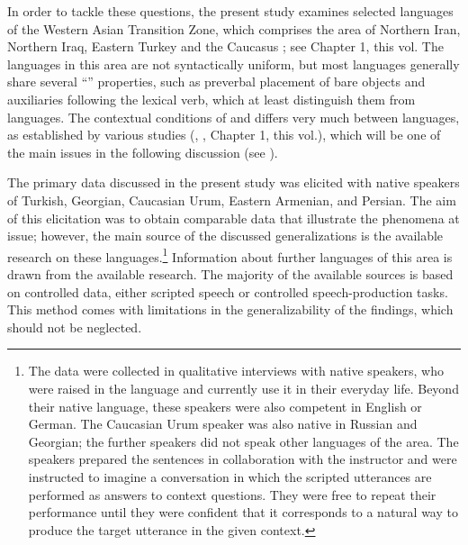 \documentclass[output=paper,colorlinks,citecolor=brown]{langscibook}
\begin{document}
In order to tackle these questions, the present study examines selected  languages of the Western Asian Transition Zone, which comprises the area of Northern Iran, Northern Iraq, Eastern Turkey and the Caucasus  \citep[350]{Stilo2015AIAtlas}{}; see Chapter 1, this vol. The languages in this area are not syntactically uniform, but most languages generally share several ``'' properties, such as preverbal placement of bare objects and auxiliaries following the lexical verb, which at least distinguish them from  languages. The contextual conditions of  and  differs very much between languages, as established by various studies (\citealt[]{stilo_preverbal_2018}, \citealt{haig_which_2023}, Chapter 1, this vol.), which will be one of the main issues in the following discussion (see ).

\largerpage
The primary data discussed in the present study was elicited with native speakers of Turkish, Georgian, Caucasian Urum, Eastern Armenian, and Persian. The aim of this elicitation was to obtain comparable data that illustrate the phenomena at issue; however, the main source of the discussed generalizations is the available research on these languages.\footnote{The data were collected in qualitative interviews with native speakers, who were raised in the  language and currently use it in their everyday life. Beyond their native language, these speakers were also competent in English or German. The Caucasian Urum speaker was also native in Russian and Georgian; the further speakers did not speak other languages of the area. The speakers prepared the sentences in collaboration with the instructor and were instructed to imagine a conversation in which the scripted utterances are performed as answers to context questions. They were free to repeat their performance until they were confident that it corresponds to a natural way to produce the target utterance in the given context.} Information about further languages
of this area is drawn from the available research. The majority of the available sources is based on controlled data, either scripted speech or controlled speech-production tasks. This method comes with limitations in the generalizability of the findings, which should not be neglected. 
\end{document}
